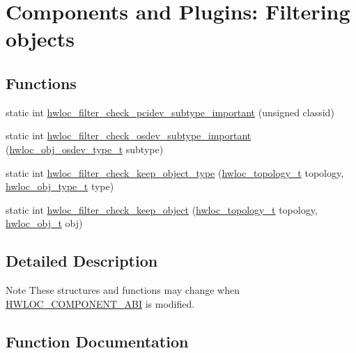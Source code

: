 \hypertarget{a00231}{}\section{Components and Plugins\+: Filtering objects}
\label{a00231}
\subsection*{Functions}
\begin{DoxyCompactItemize}
\item 
static int \hyperlink{a00231_ga60203db6459ebf275bf48c40a37661a0}{hwloc\+\_\+filter\+\_\+check\+\_\+pcidev\+\_\+subtype\+\_\+important} (unsigned classid)
\item 
static int \hyperlink{a00231_gac7d57a6d669820f360cf2a070a396560}{hwloc\+\_\+filter\+\_\+check\+\_\+osdev\+\_\+subtype\+\_\+important} (\hyperlink{a00184_ga90c1e82a60ba5871d07645169e636987}{hwloc\+\_\+obj\+\_\+osdev\+\_\+type\+\_\+t} subtype)
\item 
static int \hyperlink{a00231_ga2f402a43025a8a91e8513be1a15e4635}{hwloc\+\_\+filter\+\_\+check\+\_\+keep\+\_\+object\+\_\+type} (\hyperlink{a00186_ga9d1e76ee15a7dee158b786c30b6a6e38}{hwloc\+\_\+topology\+\_\+t} topology, \hyperlink{a00184_gacd37bb612667dc437d66bfb175a8dc55}{hwloc\+\_\+obj\+\_\+type\+\_\+t} type)
\item 
static int \hyperlink{a00231_ga4d2fdce071e5646ef147c9ff1539d1c9}{hwloc\+\_\+filter\+\_\+check\+\_\+keep\+\_\+object} (\hyperlink{a00186_ga9d1e76ee15a7dee158b786c30b6a6e38}{hwloc\+\_\+topology\+\_\+t} topology, \hyperlink{a00185_ga79b8ab56877ef99ac59b833203391c7d}{hwloc\+\_\+obj\+\_\+t} obj)
\end{DoxyCompactItemize}


\subsection{Detailed Description}
\begin{DoxyNote}{Note}
These structures and functions may change when \hyperlink{a00182_gaac5bc1f46f55e10ef0141a68ce70e21f}{H\+W\+L\+O\+C\+\_\+\+C\+O\+M\+P\+O\+N\+E\+N\+T\+\_\+\+A\+BI} is modified. 
\end{DoxyNote}


\subsection{Function Documentation}
\mbox{\label{a00231_ga4d2fdce071e5646ef147c9ff1539d1c9}} 
